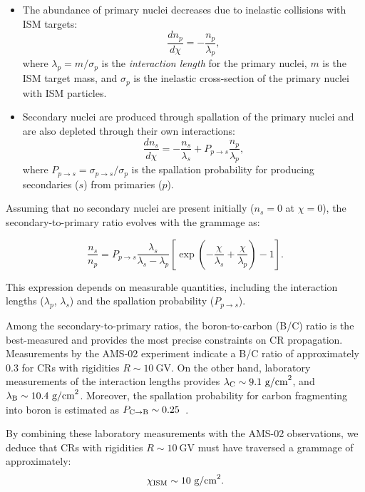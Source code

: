 \begin{itemize}
\item The abundance of primary nuclei decreases due to inelastic collisions with ISM targets:  
\[
\frac{dn_p}{d\chi} = - \frac{n_p}{\lambda_p},
\]
where \(\lambda_p = m / \sigma_p\) is the \emph{interaction length} for the primary nuclei, \(m\) is the ISM target mass, and \(\sigma_p\) is the inelastic cross-section of the primary nuclei with ISM particles.  

\item Secondary nuclei are produced through spallation of the primary nuclei and are also depleted through their own interactions:  
\[
\frac{dn_s}{d\chi} = - \frac{n_s}{\lambda_s} + P_{p \rightarrow s} \frac{n_p}{\lambda_p},
\]
where \(P_{p \rightarrow s} = \sigma_{p \rightarrow s} / \sigma_p\) is the spallation probability for producing secondaries (\(s\)) from primaries (\(p\)).  
\end{itemize}

Assuming that no secondary nuclei are present initially (\(n_s = 0\) at \(\chi = 0\)), the secondary-to-primary ratio evolves with the grammage as:  
\begin{remark}
\begin{equation}\label{eq:grammagesimple}
\frac{n_s}{n_p} = P_{p \rightarrow s} \frac{\lambda_s}{\lambda_s - \lambda_p} \left[ \exp\left( -\frac{\chi}{\lambda_s} + \frac{\chi}{\lambda_p} \right) - 1 \right].
\end{equation}
\end{remark}  

This expression depends on measurable quantities, including the interaction lengths (\(\lambda_p\), \(\lambda_s\)) and the spallation probability (\(P_{p \rightarrow s}\)).

Among the secondary-to-primary ratios, the boron-to-carbon (B/C) ratio is the best-measured and provides the most precise constraints on CR propagation. Measurements by the AMS-02 experiment indicate a B/C ratio of approximately 0.3 for CRs with rigidities \(R \sim 10~\text{GV}\).  
%
On the other hand, laboratory measurements of the interaction lengths provides \( \lambda_{\rm C} \sim 9.1~\text{g/cm}^2 \), and \( \lambda_{\rm B} \sim 10.4~\text{g/cm}^2 \). Moreover, the spallation probability for carbon fragmenting into boron is estimated as \( P_{\rm C \rightarrow B} \sim 0.25 \)~\cite{}.

By combining these laboratory measurements with the AMS-02 observations, we deduce that CRs with rigidities \(R \sim 10~\text{GV}\) must have traversed a grammage of approximately:
\begin{equation}
\chi_{\rm ISM} \sim 10~\text{g/cm}^2.
\end{equation}


